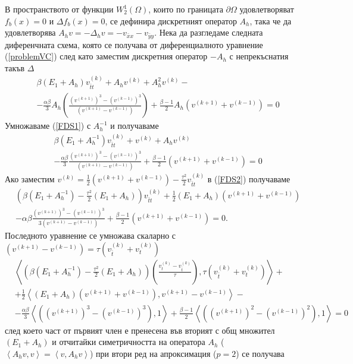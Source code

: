 \documentclass[a4paper]{article}
\newcommand{\rf}[1]{(\ref{#1})}
\theoremstyle{remark}
\begin{document}
В пространството от функции $W^1_2(\Omega)$, които по границата $\partial\Omega$ удовлетворяват $f_b(x) = 0$ и $\Delta f_b(x) = 0$, се дефинира дискретният оператор $A_h$, така че да удовлетворява $A_h v=-\Delta_h v=-v_{\bar{x}x} - v_{\bar{y}y}$. Нека да разгледаме следната диференчната схема, която се получава от диференциалното уравнение \rf{problemVC} след като заместим дискретния оператор $-A_h$ с непрекъснатия такъв $\Delta$
\begin{align}\label{FDS1}
&\beta (E_1+A_h)v_{\bar{t}t}^{(k)} + A_hv^{(k)}+A_h^2 v^{(k)} -\nonumber\\
&-\frac{\alpha \beta}{3} A_h\left(\frac{(v^{(k+1)})^3-(v^{(k-1)})^3}{(v^{(k+1)}-v^{(k-1)})} \right) + \frac{\beta - 1}{2}A_h\left( v^{(k+1)}+v^{(k-1)} \right) =0
\end{align}
Умножаваме \rf{FDS1} с $A_h^{-1}$ и получаваме
\begin{align}\label{FDS2}
&\beta (E_1+A_h^{-1})v_{\bar{t}t}^{(k)} + v^{(k)}+A_h v^{(k)} \nonumber\\
&-\frac{\alpha \beta}{3} \frac{(v^{(k+1)})^3-(v^{(k-1)})^3}{(v^{(k+1)}-v^{(k-1)})} + \frac{\beta - 1}{2}\left( v^{(k+1)} + v^{(k-1)} \right)= 0
\end{align}
Ако заместим $v^{(k)}=\frac{1}{2}(v^{(k+1)}+v^{(k-1)})-\frac{\tau^2}{2}v_{\bar{t}t}^{(k)}$ в \rf{FDS2} получаваме
\begin{align*}
&\left( \beta (E_1+A_h^{-1})- \frac{\tau^2}{2}(E_1+A_h ) \right)v_{\bar{t}t}^{(k)}  + \frac{1}{2} (E_1 +A_h )(v^{(k+1)}+v^{(k-1)}) \\
&-\alpha \beta \frac{(v^{(k+1)})^3-(v^{(k-1)})^3}{3(v^{(k+1)}-v^{(k-1)})} + \frac{\beta - 1}{2}\left( v^{(k+1)}+v^{(k-1)} \right) = 0.
\end{align*}
Последното уравнение се умножава скаларно с $(v^{(k+1)}-v^{(k-1)})=\tau (v_{\bar{t}}^{(k)} + v_{t}^{(k)})$
\begin{align*}
&\left< \left( \beta (E_1+A_h^{-1})- \frac{\tau^2}{2}( E_1+A_h ) \right) \left( \frac{v_{t}^{(k)} - v_{\bar t}^{(k)}}{\tau}   \right ), \tau (v_{\bar{t}}^{(k)} + v_{t}^{(k)}) \right>  + \\
& +\frac{1}{2} \left<  (E_1 +A_h ) \left( v^{(k+1)} + v^{(k-1)} \right ) , v^{(k+1)} - v^{(k-1)} \right> - \\
&- \frac{\alpha \beta}{3} \left< \left( (v^{(k+1)})^3-(v^{(k-1)})^3 \right), 1 \right> + \frac{\beta - 1}{2} \left< \left( (v^{(k+1)})^2-(v^{(k-1)})^2 \right), 1 \right> =0
\end{align*}
след което част от първият член е пренесена във вторият с общ множител $(E_1 + A_h )$ и отчитайки симетричността на оператора $A_h$ ($\left< A_h v,v\right> = \left< v, A_h v\right>$) при втори ред на апроксимация ($p=2$) се получава
\end{document}
